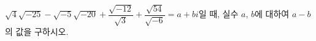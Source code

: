 $\sqrt{4}\sqrt{-25}-\sqrt{-5}\sqrt{-20}+\dfrac{\sqrt{-12}}{\sqrt{3}}+\dfrac{\sqrt{54}}{\sqrt{-6}}=a+bi$일 때, 실수 $a$, $b$에 대하여 $a-b$의 값을 구하시오.
